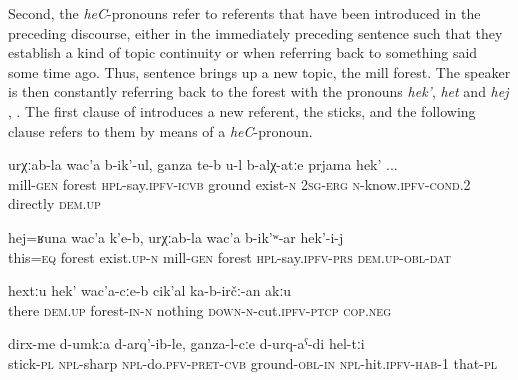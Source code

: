 Second, the \textit{heC}-pronouns refer to referents that have been introduced in the preceding discourse, either in the immediately preceding sentence such that they establish a kind of topic continuity or when referring back to something said some time ago. Thus, sentence  brings up a new topic, the mill forest. The speaker is then constantly referring back to the forest with the pronouns \textit{hek'}, \textit{het} and \textit{hej} , . The first clause of  introduces a new referent, the sticks, and the following clause refers to them by means of a \textit{heC}-pronoun.
%
\begin{exe}
	\ex
	\begin{xlist}
		\ex	\label{There is the forest that is called the mill’s forest, the ground, if you know it directly}
		\gll	urχːab-la	wac'a	b-ik'-ul,	ganza	te-b	u-l	b-alχ-atːe	prjama	hek' ...\\
			mill-\textsc{gen}	forest	\textsc{hpl}-say.\textsc{ipfv}-\textsc{icvb}	ground	exist-\textsc{n}	\textsc{2sg}-\textsc{erg}	\textsc{n}-know.\textsc{ipfv}-\textsc{cond}.2	directly	\textsc{dem.up}\\
		\glt	{}

		\ex	\label{A forest like this exists there, the mill’s forest it is called}
		\gll	hej=ʁuna	wac'a	k'e-b,	urχːab-la	wac'a	b-ik'ʷ-ar	hek'-i-j  \\
			this=\textsc{eq}	forest	exist.\textsc{up}-\textsc{n}	mill-\textsc{gen}	forest	\textsc{hpl}-say.\textsc{ipfv}-\textsc{prs}	\textsc{dem.up}-\textsc{obl}-\textsc{dat}\\
		\glt	{}

		\ex	\label{There in the forest nothing should be cut}
		\gll	hextːu		hek'	wac'a-cːe-b	cik'al	ka-b-irčː-an akːu  \\
			there		\textsc{dem.up}	forest-\textsc{in-n}	nothing	\textsc{down-n}-cut.\textsc{ipfv}-\textsc{ptcp} \textsc{cop.neg}\\
		\glt	{}
	\end{xlist}

		\label{We made sticks and hit them into the ground}
	\sn
	\gll	dirx-me	d-umkːa	d-arq'-ib-le,	ganza-l-cːe	d-urq-aˁ-di	hel-tːi\\
		stick-\textsc{pl}	\textsc{npl}-sharp	\textsc{npl}-do.\textsc{pfv}-\textsc{pret}-\textsc{cvb}	ground-\textsc{obl-in}	\textsc{npl}-hit.\textsc{ipfv}-\textsc{hab}-1	that-\textsc{pl} \\
	\glt	{}
\end{exe}

